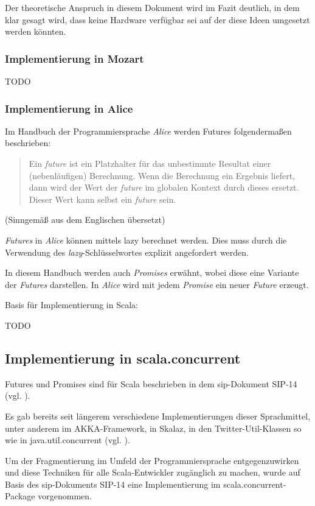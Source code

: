 \documentclass[11pt,a4paper,titlepage,ngerman]{scrartcl}
\begin{document}
Der theoretische Anspruch in diesem Dokument wird im Fazit deutlich, in dem klar 
gesagt wird, dass keine Hardware verfügbar sei auf der diese Ideen umgesetzt 
werden könnten.

\subsubsection{Implementierung in Mozart \cite{futures:98}}

TODO

\subsubsection{Implementierung in Alice \cite{aliceFuture}}

Im Handbuch der Programmiersprache \emph{Alice} werden Futures folgendermaßen
beschrieben:
\begin{quote}
Ein \emph{future} ist ein Platzhalter für das unbestimmte Resultat einer
(nebenläufigen) Berechnung. Wenn die Berechnung ein Ergebnis liefert, dann
wird der Wert der \emph{future} im globalen Kontext durch dieses ersetzt.
Dieser Wert kann selbst ein \emph{future} sein.
\end{quote} (Sinngemäß aus dem Englischen übersetzt)

\emph{Futures} in \emph{Alice} können mittels \gls{lazy} berechnet werden. 
Dies muss durch die Verwendung des \emph{lazy}-Schlüsselwortes explizit angefordert werden.

In diesem Handbuch werden auch \emph{Promises} erwähnt, wobei diese eine Variante
der \emph{Futures} darstellen. In \emph{Alice} wird mit jedem \emph{Promise}
ein neuer \emph{Future} erzeugt.

Basis für Implementierung in Scala: \cite{Lea:2000:JFF:337449.337465}

TODO

\subsection{Implementierung in scala.concurrent}

Futures und Promises sind für Scala beschrieben in dem \gls{sip}-Dokument SIP-14 
(vgl. \cite{sip14}).

Es gab bereits seit längerem verschiedene Implementierungen dieser Sprachmittel,
unter anderem im AKKA-Framework, in Skalaz, in den Twitter-Util-Klassen so wie
in java.util.concurrent (vgl. \cite{futuresTry}).

Um der Fragmentierung im Umfeld der Programmiersprache entgegenzuwirken und
diese Techniken für alle Scala-Entwickler zugänglich zu machen, wurde auf Basis
des \gls{sip}-Dokuments SIP-14 eine Implementierung im scala.concurrent-Package
vorgenommen.
\end{document}
